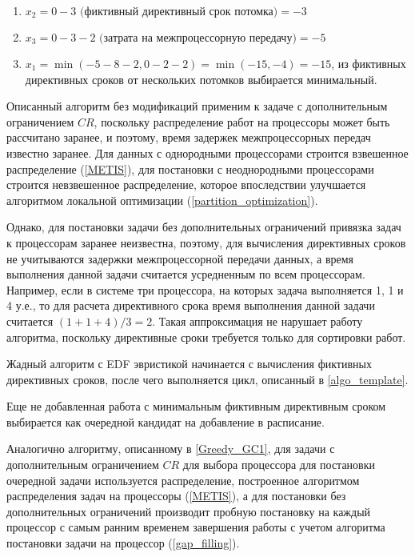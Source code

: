 \begin{enumerate}
    \item $x_2 = 0 - 3 \text{ (фиктивный директивный срок потомка)} = -3$
    \item $x_3 = 0 - 3 - 2 \text{ (затрата на межпроцессорную передачу)} = -5$
    \item $x_1 = \min \left(- 5 - 8 - 2, 0 - 2 - 2\right) = \min \left(-15, -4\right) = -15$, из фиктивных директивных сроков от нескольких потомков выбирается минимальный.
\end{enumerate}

Описанный алгоритм без модификаций применим к задаче с дополнительным ограничением $CR$, поскольку распределение работ на процессоры может быть рассчитано заранее, и поэтому, время задержек межпроцессорных передач известно заранее. Для данных с однородными процессорами строится взвешенное распределение (\ref{METIS}), для постановки с неоднородными процессорами строится невзвешенное распределение, которое впоследствии улучшается алгоритмом локальной оптимизации (\ref{partition_optimization}).

Однако, для постановки задачи без дополнительных ограничений привязка задач к процессорам заранее неизвестна, поэтому, для вычисления директивных сроков не учитываются задержки межпроцессорной передачи данных, а время выполнения данной задачи считается усредненным по всем процессорам. Например, если в системе три процессора, на которых задача выполняется 1, 1 и 4 у.е., то для расчета директивного срока время выполнения данной задачи считается $(1+1+4)/3 = 2$. Такая аппроксимация не нарушает работу алгоритма, поскольку директивные сроки требуется только для сортировки работ.

Жадный алгоритм с EDF эвристикой начинается с вычисления фиктивных директивных сроков, после чего выполняется цикл, описанный в \ref{algo_template}.

Еще не добавленная работа с минимальным фиктивным директивным сроком выбирается как очередной кандидат на добавление в расписание.

Аналогично алгоритму, описанному в \ref{Greedy_GC1}, для задачи с дополнительным ограничением $CR$ для выбора процессора для постановки очередной задачи используется распределение, построенное алгоритмом распределения задач на процессоры (\ref{METIS}), а для постановки без дополнительных ограничений производит пробную постановку на каждый процессор с самым ранним временем завершения работы с учетом алгоритма постановки задачи на процессор (\ref{gap_filling}).

